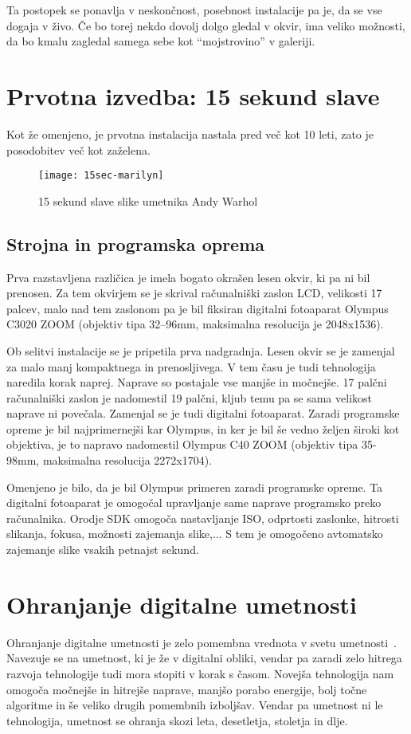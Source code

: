 Ta postopek se ponavlja v neskončnost, posebnost instalacije pa je, da se vse dogaja v živo. Če bo torej nekdo dovolj dolgo gledal v okvir, ima veliko možnosti, da bo kmalu zagledal samega sebe kot ``mojstrovino'' v galeriji.




\chapter{Prvotna izvedba: 15 sekund slave}

Kot že omenjeno, je prvotna instalacija nastala pred več kot 10 leti, zato je posodobitev več kot zaželena.

\begin{figure}[!ht]
    \centering
    \texttt{[image: 15sec-marilyn]}
    \caption{15 sekund slave slike umetnika Andy Warhol}
    \label{fig:15sec-marilyn}
\end{figure}

\section{Strojna in programska oprema}
Prva razstavljena različica je imela bogato okrašen lesen okvir, ki pa ni bil prenosen. Za tem okvirjem se je skrival računalniški zaslon LCD, velikosti 17
palcev, malo nad tem zaslonom pa je bil fiksiran digitalni fotoaparat Olympus C3020 ZOOM (objektiv tipa 32–96mm, maksimalna resolucija je 2048x1536).

Ob selitvi instalacije se je pripetila prva nadgradnja. Lesen okvir se je
zamenjal za malo manj kompaktnega in prenosljivega. V tem času je tudi
tehnologija naredila korak naprej. Naprave so postajale vse manjše in močnejše. 17 palčni računalniški zaslon je nadomestil 19 palčni, kljub temu pa se sama velikost naprave ni povečala. Zamenjal se je tudi digitalni fotoaparat.
Zaradi programske opreme je bil najprimernejši kar Olympus, in ker je bil še
vedno željen široki kot objektiva, je to napravo nadomestil Olympus C40 ZOOM (objektiv tipa 35-98mm, maksimalna resolucija 2272x1704).

Omenjeno je bilo, da je bil Olympus primeren zaradi programske opreme. Ta
digitalni fotoaparat je omogočal upravljanje same naprave programsko preko
računalnika. Orodje SDK omogoča nastavljanje ISO, odprtosti zaslonke, hitrosti slikanja, fokusa, možnosti zajemanja slike,... S tem je omogočeno avtomatsko
zajemanje slike vsakih petnajst sekund.


\chapter{Ohranjanje digitalne umetnosti}
Ohranjanje digitalne umetnosti je zelo pomembna vrednota v svetu
umetnosti~\cite{ZKM}. Navezuje se na umetnost, ki je že v digitalni obliki,
vendar pa zaradi zelo hitrega razvoja tehnologije tudi mora stopiti v korak s
časom. Novejša tehnologija nam omogoča močnejše in hitrejše naprave, manjšo
porabo energije, bolj točne algoritme in še veliko drugih pomembnih izboljšav.
Vendar pa umetnost ni le tehnologija, umetnost se ohranja skozi leta,
desetletja, stoletja in dlje.


